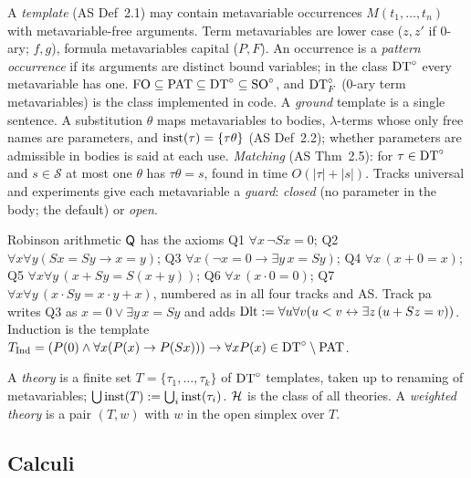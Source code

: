 A \emph{template} (AS Def~2.1) may contain metavariable occurrences $M(t_1,\dots,t_n)$ with metavariable-free arguments. Term metavariables are lower case ($z,z'$ if $0$-ary; $f,g$), formula metavariables capital ($P,F$). An occurrence is a \emph{pattern occurrence} if its arguments are distinct bound variables; in the class $\mathrm{DT}^{\circ}$ every metavariable has one. $\mathrm{FO}\subseteq\mathrm{PAT}\subseteq\mathrm{DT}^{\circ}\subseteq\mathrm{SO}^{\circ}$, and $\mathrm{DT}^{\circ}_{F}$ ($0$-ary term metavariables) is the class implemented in code. A \emph{ground} template is a single sentence. A substitution $\theta$ maps metavariables to bodies, $\lambda$-terms whose only free names are parameters, and $\mathrm{inst}(\tau)=\{\tau\theta\}$ (AS Def~2.2); whether parameters are admissible in bodies is said at each use. \emph{Matching} (AS Thm~2.5): for $\tau\in\mathrm{DT}^{\circ}$ and $s\in\mathcal S$ at most one $\theta$ has $\tau\theta=s$, found in time $O(|\tau|+|s|)$. Tracks universal and experiments give each metavariable a \emph{guard}: \emph{closed} (no parameter in the body; the default) or \emph{open}.

Robinson arithmetic $\mathsf{Q}$ has the axioms Q1 $\forall x\,\neg Sx=0$; Q2 $\forall x\forall y(Sx=Sy\to x=y)$; Q3 $\forall x(\neg x=0\to\exists y\,x=Sy)$; Q4 $\forall x\,(x+0=x)$; Q5 $\forall x\forall y\,(x+Sy=S(x+y))$; Q6 $\forall x\,(x\cdot 0=0)$; Q7 $\forall x\forall y\,(x\cdot Sy=x\cdot y+x)$, numbered as in all four tracks and AS. Track pa writes Q3 as $x=0\vee\exists y\,x=Sy$ and adds $\mathrm{Dlt}:=\forall u\forall v(u<v\leftrightarrow\exists z\,(u+Sz=v))$. Induction is the template $T_{\mathrm{Ind}}=(P(0)\wedge\forall x(P(x)\to P(Sx)))\to\forall xP(x)\in\mathrm{DT}^{\circ}\setminus\mathrm{PAT}$.

\begin{definition}[Theories]\label{def:model:theory}
A \emph{theory} is a finite set $T=\{\tau_1,\dots,\tau_k\}$ of $\mathrm{DT}^{\circ}$ templates, taken up to renaming of metavariables; $\bigcup\mathrm{inst}(T):=\bigcup_i\mathrm{inst}(\tau_i)$. $\mathcal{H}$ is the class of all theories. A \emph{weighted theory} is a pair $(T,w)$ with $w$ in the open simplex over $T$.
\end{definition}

\subsection{Calculi}\label{sec:model:calculi}

